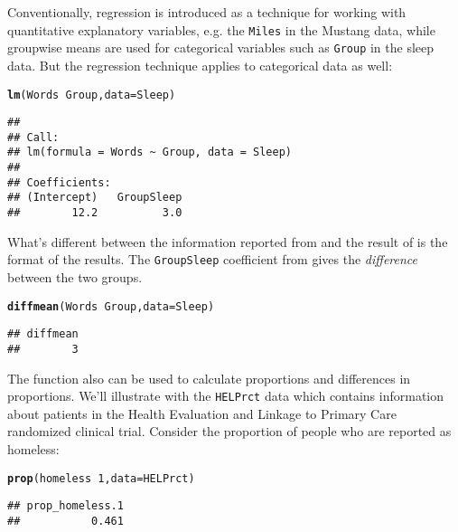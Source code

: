 \documentclass[11pt]{article}\usepackage[]{graphicx}\usepackage[]{color}
\makeatletter
\newcommand{\hlnum}[1]{\textcolor[rgb]{0.686,0.059,0.569}{#1}}%
\newcommand{\hlopt}[1]{\textcolor[rgb]{0,0,0}{#1}}%
\newcommand{\hlstd}[1]{\textcolor[rgb]{0.345,0.345,0.345}{#1}}%
\newcommand{\hlkwc}[1]{\textcolor[rgb]{0.333,0.667,0.333}{#1}}%
\newcommand{\hlkwd}[1]{\textcolor[rgb]{0.737,0.353,0.396}{\textbf{#1}}}%
\newenvironment{kframe}{%
 \def\at@end@of@kframe{}%
 \ifinner\ifhmode%
  \def\at@end@of@kframe{\end{minipage}}%
  \begin{minipage}{\columnwidth}%
 \fi\fi%
 \def\FrameCommand##1{\hskip\@totalleftmargin \hskip-\fboxsep
 \colorbox{shadecolor}{##1}\hskip-\fboxsep
     \hskip-\linewidth \hskip-\@totalleftmargin \hskip\columnwidth}%
 \MakeFramed {\advance\hsize-\width
   \@totalleftmargin\z@ \linewidth\hsize
   \@setminipage}}%
 {\par\unskip\endMakeFramed%
 \at@end@of@kframe}
\newenvironment{knitrout}{}{} %
\makeatother
\begin{document}
Conventionally, regression is introduced as a technique for working with quantitative explanatory variables, e.g. the \texttt{Miles} in the Mustang data, while groupwise means are used for categorical variables such as \texttt{Group} in the sleep data.  But the regression technique applies to categorical data as well:
\begin{knitrout}
\color{fgcolor}\begin{kframe}
\begin{alltt}
\hlkwd{lm}\hlstd{(Words} \hlopt{~} \hlstd{Group,} \hlkwc{data} \hlstd{= Sleep)}
\end{alltt}
\begin{verbatim}
## 
## Call:
## lm(formula = Words ~ Group, data = Sleep)
## 
## Coefficients:
## (Intercept)   GroupSleep  
##        12.2          3.0
\end{verbatim}
\end{kframe}
\end{knitrout}
What's different between the information reported from  and the result of  is the format of the results.  The \texttt{GroupSleep} coefficient from  gives the {\em difference} between the two groups.
\begin{knitrout}
\color{fgcolor}\begin{kframe}
\begin{alltt}
\hlkwd{diffmean}\hlstd{(Words} \hlopt{~} \hlstd{Group,} \hlkwc{data} \hlstd{= Sleep)}
\end{alltt}
\begin{verbatim}
## diffmean 
##        3
\end{verbatim}
\end{kframe}
\end{knitrout}

The  function also can be used to calculate proportions and differences in proportions.  We'll illustrate with the \texttt{HELPrct} data which contains information about patients in the Health Evaluation and Linkage to Primary Care randomized clinical trial.  Consider the proportion of people who are reported as homeless:
\begin{knitrout}
\color{fgcolor}\begin{kframe}
\begin{alltt}
\hlkwd{prop}\hlstd{(homeless} \hlopt{~} \hlnum{1}\hlstd{,} \hlkwc{data} \hlstd{= HELPrct)}
\end{alltt}
\begin{verbatim}
## prop_homeless.1 
##           0.461
\end{verbatim}
\end{kframe}
\end{knitrout}
\end{document}
